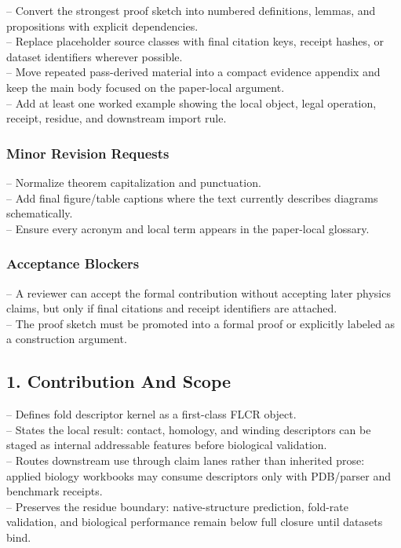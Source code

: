 \documentclass[11pt]{article}
\begin{document}
\noindent{}-- Convert the strongest proof sketch into numbered definitions, lemmas, and propositions with explicit dependencies.\\
\noindent{}-- Replace placeholder source classes with final citation keys, receipt hashes, or dataset identifiers wherever possible.\\
\noindent{}-- Move repeated pass-derived material into a compact evidence appendix and keep the main body focused on the paper-local argument.\\
\noindent{}-- Add at least one worked example showing the local object, legal operation, receipt, residue, and downstream import rule.\\

\subsubsection*{Minor Revision Requests}

\noindent{}-- Normalize theorem capitalization and punctuation.\\
\noindent{}-- Add final figure/table captions where the text currently describes diagrams schematically.\\
\noindent{}-- Ensure every acronym and local term appears in the paper-local glossary.\\

\subsubsection*{Acceptance Blockers}

\noindent{}-- A reviewer can accept the formal contribution without accepting later physics claims, but only if final citations and receipt identifiers are attached.\\
\noindent{}-- The proof sketch must be promoted into a formal proof or explicitly labeled as a construction argument.\\


\subsection*{1. Contribution And Scope}

\noindent{}-- Defines fold descriptor kernel as a first-class FLCR object.\\
\noindent{}-- States the local result: contact, homology, and winding descriptors can be staged as internal addressable features before biological validation.\\
\noindent{}-- Routes downstream use through claim lanes rather than inherited prose: applied biology workbooks may consume descriptors only with PDB/parser and benchmark receipts.\\
\noindent{}-- Preserves the residue boundary: native-structure prediction, fold-rate validation, and biological performance remain below full closure until datasets bind.\\
\end{document}
